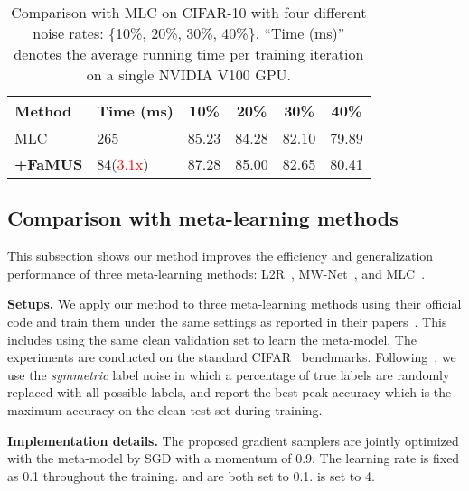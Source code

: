 \documentclass[final]{cvpr}
\begin{document}
\iftrue
\begin{table}[t]
	\centering
	\small
	\begin{tabular}{|l|l|cccc|}
		\hline
		Method & Time (ms) & 10\% & 20\% & 30\% & 40\% \\
		\hline
		MLC~\cite{wang2020training} & 265 & 85.23 & 84.28 & 82.10 & 79.89 \\ 
		\hline
		\textbf{+FaMUS} & 84(\textcolor{red}{3.1x}) & 87.28 & 85.00 & 82.65 & 80.41 \\
		\hline
	\end{tabular}
	\vspace{-2mm}
	\caption{Comparison with MLC on CIFAR-10 with four different noise rates: \{10\%, 20\%, 30\%, 40\%\}. ``Time (ms)'' denotes the average running time per training iteration on a single NVIDIA V100 GPU.}\label{tab:cifar10_mlc_uniform}
	\vspace{-5mm}
\end{table}
\fi 


\subsection{Comparison with meta-learning methods}\label{sec:comp_meta_methods}

This subsection shows our method improves the efficiency and generalization performance of three meta-learning methods: L2R~\cite{ren2018learning}, MW-Net~\cite{shu2019meta}, and MLC~\cite{wang2020training}. 

\textbf{Setups.} We apply our method to three meta-learning methods using their official code and train them under the same settings as reported in their papers~\cite{ren2018learning, shu2019meta, wang2020training}. This includes using the same clean validation set to learn the meta-model. The experiments are conducted on the standard CIFAR~\cite{krizhevsky2009learning} benchmarks. Following~\cite{wang2020training}, we use the \textit{symmetric} label noise in which a percentage of true labels are randomly replaced with all possible labels, and report the best peak accuracy which is the maximum accuracy on the clean test set during training. 

\textbf{Implementation details.} The proposed gradient samplers are jointly optimized with the meta-model by SGD with a momentum of 0.9. The learning rate is fixed as 0.1 throughout the training. 
 and  are both set to 0.1.  is set to 4.
\end{document}
